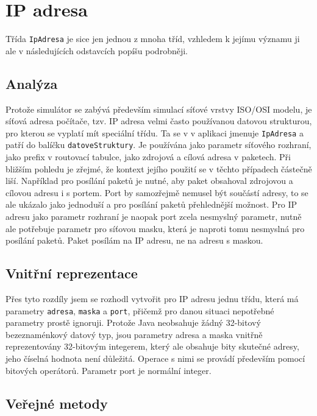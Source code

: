 
\section{IP adresa}

Třída \verb|IpAdresa| je sice jen jednou z mnoha tříd, vzhledem k jejímu významu ji ale v následujících odstavcích popíšu podrobněji.


\subsection{Analýza}

Protože simulátor se zabývá především simulací síťové vrstvy ISO/OSI modelu, je síťová adresa počítače, tzv. IP adresa velmi často používanou datovou strukturou, pro kterou se vyplatí mít speciální třídu. Ta se v v aplikaci jmenuje \verb|IpAdresa| a patří do balíčku \verb|datoveStruktury|. Je používána jako parametr síťového rozhraní, jako prefix v routovací tabulce, jako zdrojová a cílová adresa v paketech. Při bližším pohledu je zřejmé, že kontext jejího použití se v těchto případech částečně liší. Například pro posílání paketů je nutné, aby paket obsahoval zdrojovou a cílovou adresu i s portem. Port by samozřejmě nemusel být součástí adresy, to se ale ukázalo jako jednoduší a pro posílání paketů přehlednější možnost. Pro IP adresu jako parametr rozhraní je naopak port zcela nesmyslný parametr, nutně ale potřebuje parametr pro síťovou masku, která je naproti tomu nesmyslná pro posílání paketů. Paket posílám na IP adresu, ne na adresu s maskou.


\subsection{Vnitřní reprezentace}

Přes tyto rozdíly jsem se rozhodl vytvořit pro IP adresu jednu třídu, která má parametry \verb|adresa|, \verb|maska| a \verb|port|, přičemž pro danou situaci nepotřebné parametry prostě ignoruji. Protože Java neobsahuje žádný 32-bitový bezeznaménkový datový typ, jsou parametry adresa a maska vnitřně reprezentovány 32-bitovým integerem, který ale obsahuje bity skutečné adresy, jeho číselná hodnota není důležitá. Operace s nimi se provádí především pomocí bitových operátorů. Parametr port je normální integer.


\subsection{Veřejné metody}

